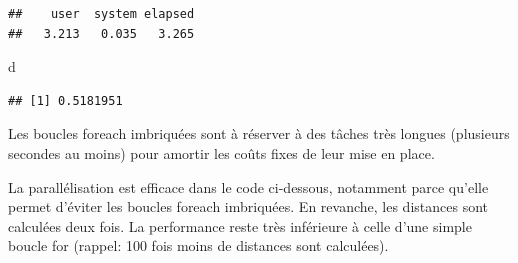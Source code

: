 \documentclass[
  12pt,
  french,
  a4paper,
  extrafontsizes,onecolumn,openright
  ]{memoir}
\newenvironment{Shaded}{\begin{snugshade}}{\end{snugshade}}
\newcommand{\ControlFlowTok}[1]{\textcolor[rgb]{0.13,0.29,0.53}{\textbf{#1}}}
\newcommand{\DataTypeTok}[1]{\textcolor[rgb]{0.13,0.29,0.53}{#1}}
\newcommand{\DecValTok}[1]{\textcolor[rgb]{0.00,0.00,0.81}{#1}}
\newcommand{\KeywordTok}[1]{\textcolor[rgb]{0.13,0.29,0.53}{\textbf{#1}}}
\newcommand{\NormalTok}[1]{#1}
\newcommand{\OperatorTok}[1]{\textcolor[rgb]{0.81,0.36,0.00}{\textbf{#1}}}
\newcommand{\StringTok}[1]{\textcolor[rgb]{0.31,0.60,0.02}{#1}}
\newlength{\rf}
\begin{document}
\begin{verbatim}
##    user  system elapsed 
##   3.213   0.035   3.265
\end{verbatim}

\begin{Shaded}
\begin{Highlighting}[]
\NormalTok{d}
\end{Highlighting}
\end{Shaded}

\begin{verbatim}
## [1] 0.5181951
\end{verbatim}

\normalsize

Les boucles foreach imbriquées sont à réserver à des tâches très longues (plusieurs secondes au moins) pour amortir les coûts fixes de leur mise en place.

La parallélisation est efficace dans le code ci-dessous, notamment parce qu'elle permet d'éviter les boucles foreach imbriquées.
En revanche, les distances sont calculées deux fois.
La performance reste très inférieure à celle d'une simple boucle for (rappel: 100 fois moins de distances sont calculées).

\scriptsize

\begin{Shaded}
\end{Shaded}
\end{document}
